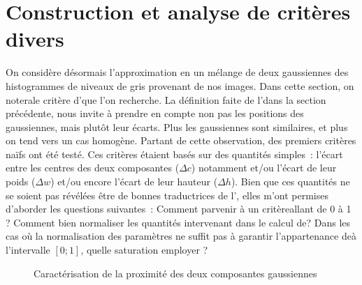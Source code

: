 \documentclass[main.tex]{subfiles}
\begin{document}
\section{Construction et analyse de critères divers}
On considère désormais l'approximation en un mélange de deux gaussiennes des histogrammes de niveaux de gris provenant de nos images. Dans cette section, on notera\HH le critère d'\hetero que l'on recherche. 
La définition faite de l'\hetero dans la section précédente, nous invite à prendre en compte non pas les positions des gaussiennes, mais plutôt leur écarts. Plus les gaussiennes sont similaires, et plus on tend vers un cas homogène. Partant de cette observation, 
des premiers critères naïfs ont été testé. Ces critères étaient basés sur des quantités simples~:  l'écart entre les centres des deux composantes ($\Delta c$) notamment et/ou l'écart de leur poids  ($\Delta w$) et/ou encore l'écart de leur hauteur ($\Delta h$). Bien que ces quantités ne se soient pas révélées être de bonnes traductrices de l'\hetero, elles m'ont permises d'aborder les questions suivantes~:
Comment parvenir à un critère\HH allant de 0 à 1 ? Comment bien normaliser les quantités intervenant dans le calcul de\HH ? Dans les cas où la normalisation des paramètres ne suffit pas à garantir l'appartenance de\HH à l'intervalle $[0;1]$, quelle saturation employer ? 

\begin{figure}
\centering
{}\qquad
{}
\caption{Caractérisation de la proximité des deux composantes gaussiennes}
\end{figure}
\end{document}
